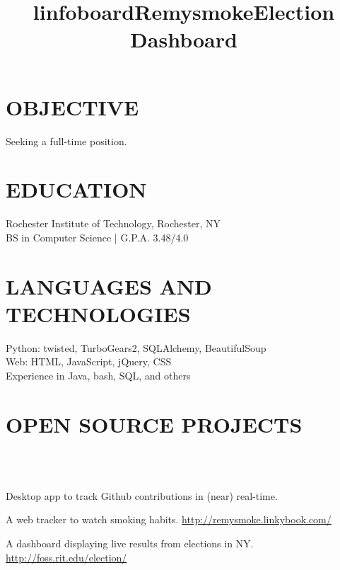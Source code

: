 \documentclass[line]{res}
\begin{document}

\begin{resume}

\section{OBJECTIVE}
    Seeking a full-time position.

\section{EDUCATION}
    Rochester Institute of Technology, Rochester, NY \\
    BS in Computer Science | G.P.A. 3.48/4.0

\section{LANGUAGES AND TECHNOLOGIES}
    Python: twisted, TurboGears2, SQLAlchemy, BeautifulSoup\\
    Web: HTML, JavaScript, jQuery, CSS\\
    Experience in Java, bash, SQL, and others

\section{OPEN SOURCE PROJECTS}
    \begin{format}
        \title{l}\\
        \\
        \body
    \end{format}

    \title{infoboard}
    \begin{position}
        Desktop app to track Github contributions in (near) real-time.
    \end{position}

    \title{Remysmoke}
    \begin{position}
        A web tracker to watch smoking habits. \url{http://remysmoke.linkybook.com/}
    \end{position}

    \title{Election Dashboard}
    \begin{position}
        A dashboard displaying live results from elections in NY. \url{http://foss.rit.edu/election/}
    \end{position}


\end{resume}
\end{document}
